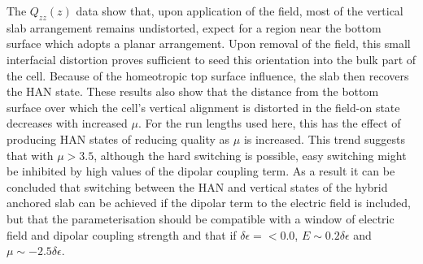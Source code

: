 The $Q_{zz}(z)$ data show that, upon application of the field, most of the vertical slab
arrangement remains 
undistorted, expect for a
region near the bottom surface which adopts a planar arrangement. Upon removal of the field,
this small interfacial distortion proves sufficient to seed this orientation into the bulk part of
the cell. Because of the homeotropic top surface influence, the slab then recovers the HAN state.
These results also show that the distance from the bottom surface over which the cell's vertical
alignment is
distorted in the field-on state decreases with increased $\mu$. For the run lengths used here,
this has the effect of producing 
HAN states of reducing quality as $\mu$ is increased. This trend suggests that with
$\mu>3.5$, although the hard switching is possible, easy switching might be inhibited by
high values of the dipolar coupling term. As a result it can be concluded that switching 
between the HAN and vertical states of the hybrid anchored slab can be achieved if the dipolar
term to the electric field is included, but that the 
parameterisation should be compatible with a window of electric field and
dipolar coupling strength and that if $\delta\epsilon =< 0.0$, $E \sim 0.2\delta\epsilon$ 
and $\mu \sim -2.5\delta\epsilon$.












